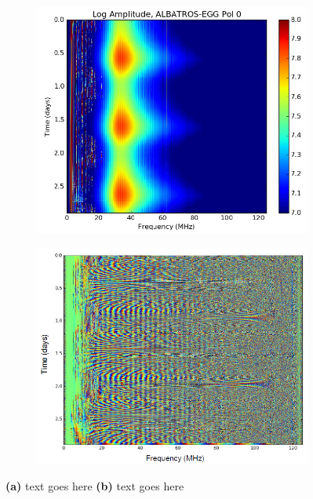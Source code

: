 \documentclass{ws-jai}
\begin{document}
\begin{figure}
    \centering
    \begin{subfigure}[t]{0.48\textwidth}
        \centering
        \includegraphics[width=\linewidth]{Figures/Raw-ALBATROS-autospectra.PNG}
        \caption{} \label{Fig:waterfall_auto}
    \end{subfigure}
    \hfill
    \begin{subfigure}[t]{0.48\textwidth}
      \centering
        \includegraphics[width=\linewidth]{Figures/First-fringes-of-ALBATROS-EGG.PNG}
        \caption{} \label{Fig:waterfall_phase}
    \end{subfigure}
    \caption{{\bf (a)} text goes here {\bf (b)} text goes
      here}\label{Fig:waterfalls}
\end{figure}
\end{document}
